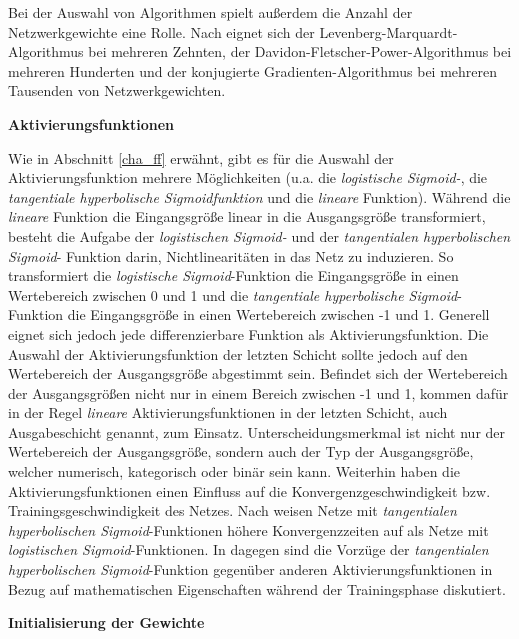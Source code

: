 Bei der Auswahl von Algorithmen spielt außerdem  die Anzahl der Netzwerkgewichte eine Rolle. Nach \cite{WarrenS.Sarle.1994} eignet sich der Levenberg-Marquardt-Algorithmus bei mehreren Zehnten, der Davidon-Fletscher-Power-Algorithmus bei mehreren Hunderten und der konjugierte Gradienten-Algorithmus bei mehreren Tausenden von Netzwerkgewichten. 


\textbf{Aktivierungsfunktionen} 

Wie in Abschnitt \ref{cha_ff} erwähnt, gibt es für die Auswahl der Aktivierungsfunktion mehrere Möglichkeiten (u.a. die \textit{logistische Sigmoid-}, die \textit{tangentiale hyperbolische Sigmoidfunktion} und die \textit{lineare} Funktion). Während die \textit{lineare} Funktion die Eingangsgröße linear in die Ausgangsgröße transformiert, besteht die Aufgabe der \textit{logistischen Sigmoid-} und der \textit{tangentialen hyperbolischen Sigmoid}- Funktion darin, Nichtlinearitäten in das Netz zu induzieren. So transformiert die \textit{logistische Sigmoid}-Funktion die Eingangsgröße in einen Wertebereich zwischen 0 und 1 und die \textit{tangentiale hyperbolische Sigmoid}-Funktion die Eingangsgröße in einen Wertebereich zwischen -1 und 1. Generell eignet sich jedoch jede differenzierbare Funktion als Aktivierungsfunktion. Die Auswahl der Aktivierungsfunktion der letzten Schicht sollte jedoch auf den Wertebereich der Ausgangsgröße abgestimmt sein. Befindet sich der Wertebereich der Ausgangsgrößen nicht nur in einem Bereich zwischen -1 und 1, kommen dafür in der Regel \textit{lineare} Aktivierungsfunktionen in der letzten Schicht, auch Ausgabeschicht genannt, zum Einsatz. Unterscheidungsmerkmal ist nicht nur der Wertebereich der Ausgangsgröße, sondern auch der Typ der Ausgangsgröße, welcher numerisch, kategorisch oder binär sein kann.  Weiterhin haben die Aktivierungsfunktionen einen Einfluss auf die Konvergenzgeschwindigkeit bzw. Trainingsgeschwindigkeit des Netzes. Nach \cite{Bishop.2010} weisen Netze mit \textit{tangentialen hyperbolischen Sigmoid}-Funktionen höhere Konvergenzzeiten auf als Netze mit \textit{logistischen Sigmoid}-Funktionen. In \cite{Kalman.June1992} dagegen sind die Vorzüge der \textit{tangentialen hyperbolischen Sigmoid}-Funktion gegenüber anderen Aktivierungsfunktionen in Bezug auf mathematischen Eigenschaften während der Trainingsphase diskutiert.

\textbf{Initialisierung der Gewichte}

